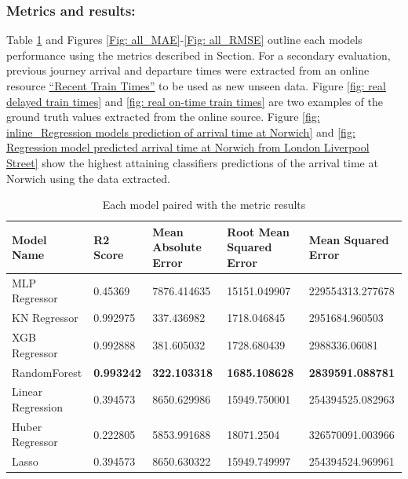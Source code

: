 \subsubsection{Metrics and results:}\label{sec: Metrics and results}
Table \ref{tab:model metrics} and Figures \ref{Fig: all_MAE}-\ref{Fig: all_RMSE} outline each models performance using the metrics described in Section. For a secondary evaluation, previous journey arrival and departure times were extracted from an online resource \href{https://www.recenttraintimes.co.uk/}{``Recent Train Times''} to be used as new unseen data. Figure \ref{fig: real delayed train times} and \ref{fig: real on-time train times} are two examples of the ground truth values extracted from the online source. Figure \ref{fig: inline_Regression models prediction of arrival time at Norwich} and \ref{fig: Regression model predicted arrival time at Norwich from London Liverpool Street} show the highest attaining classifiers predictions of the arrival time at Norwich using the data extracted.

\begin{table}[!htbp]
    \centering
    \begin{tabularx}{\textwidth}{XXXXX}
    \hline
    \textbf{Model Name} & \textbf{R2 Score} & \textbf{Mean Absolute Error} & \textbf{Root Mean Squared Error} & \textbf{Mean Squared Error} \\ 
    \hline
    MLP Regressor & 0.45369 & 7876.414635 & 15151.049907 & 229554313.277678 \\
    KN Regressor & 0.992975 & 337.436982 & 1718.046845 & 2951684.960503 \\
    XGB Regressor & 0.992888 & 381.605032 & 1728.680439 & 2988336.06081 \\
    RandomForest & \textbf{0.993242} & \textbf{322.103318} & \textbf{1685.108628} & \textbf{2839591.088781} \\
    Linear Regression & 0.394573 & 8650.629986 & 15949.750001 & 254394525.082963 \\
    Huber Regressor & 0.222805 & 5853.991688 & 18071.2504 & 326570091.003966 \\
    Lasso & 0.394573 & 8650.630322 & 15949.749997 & 254394524.969961 \\
    \hline
    \end{tabularx}
    \caption{Each model paired with the metric results}
    \label{tab:model metrics}
\end{table}

